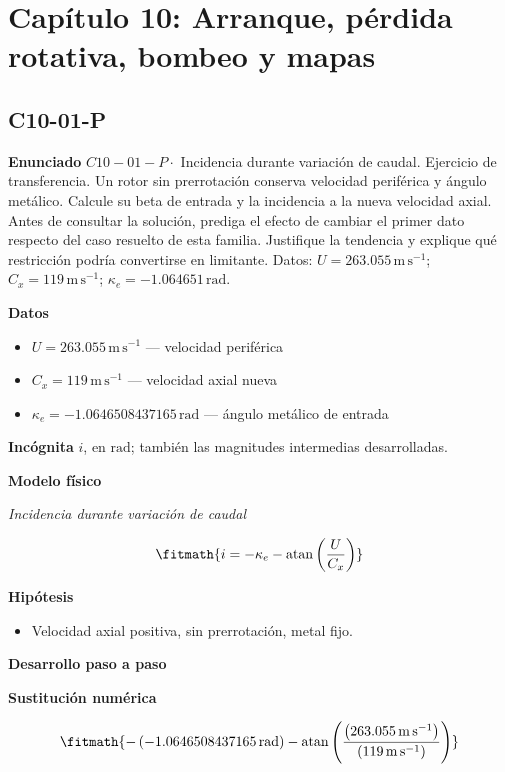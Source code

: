 \documentclass[10pt,openany]{book}
\begin{document}
\section{Capítulo 10: Arranque, pérdida rotativa, bombeo y mapas}
\subsection*{C10-01-P}

\noindent\textbf{Enunciado}
\(C10-01-P \cdot\) Incidencia durante variación de caudal. Ejercicio de transferencia. Un rotor sin prerrotación conserva velocidad periférica y ángulo metálico. Calcule su beta de entrada y la incidencia a la nueva velocidad axial. Antes de consultar la solución, prediga el efecto de cambiar el primer dato respecto del caso resuelto de esta familia. Justifique la tendencia y explique qué restricción podría convertirse en limitante. Datos: \(U=263.055\, \mathrm{m}\,\mathrm{s}^{-1}\); \(C_x=119\, \mathrm{m}\,\mathrm{s}^{-1}\); \(\kappa_e=-1.064651\, \mathrm{rad}\).

\noindent\textbf{Datos}
\begin{itemize}
\item $U = 263.055\,\mathrm{m}\,\mathrm{s}^{-1}$ — velocidad periférica
\item $C_x = 119\,\mathrm{m}\,\mathrm{s}^{-1}$ — velocidad axial nueva
\item $\kappa_e = -1.0646508437165\,\mathrm{rad}$ — ángulo metálico de entrada
\end{itemize}

\noindent\textbf{Incógnita}
$i$, en $\mathrm{rad}$; también las magnitudes intermedias desarrolladas.

\noindent\textbf{Modelo físico}

\noindent\textit{Incidencia durante variación de caudal}

\[
\fitmath{i=- \kappa_e - \operatorname{atan}{\left(\frac{U}{C_x} \right)}}
\]

\noindent\textbf{Hipótesis}
\begin{itemize}
\item Velocidad axial positiva, sin prerrotación, metal fijo.
\end{itemize}

\noindent\textbf{Desarrollo paso a paso}



\noindent\textbf{Sustitución numérica}

\[
\fitmath{- \left(-1.0646508437165\,\mathrm{rad}\right) - \operatorname{atan}{\left(\frac{\left(263.055\,\mathrm{m}\,\mathrm{s}^{-1}\right)}{\left(119\,\mathrm{m}\,\mathrm{s}^{-1}\right)} \right)}}
\]
\end{document}
